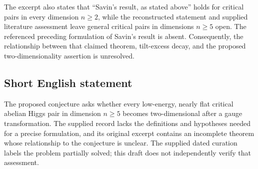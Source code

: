 \documentclass[11pt]{article}
\begin{document}
The excerpt also states that ``Savin's result, as stated above'' holds for critical pairs in every dimension \(n\geq2\), while the reconstructed statement and supplied literature assessment leave general critical pairs in dimensions \(n\geq5\) open. The referenced preceding formulation of Savin's result is absent. Consequently, the relationship between that claimed theorem, tilt-excess decay, and the proposed two-dimensionality assertion is unresolved.
\subsection{Short English statement}
The proposed conjecture asks whether every low-energy, nearly flat critical abelian Higgs pair in dimension \(n\geq5\) becomes two-dimensional after a gauge transformation. The supplied record lacks the definitions and hypotheses needed for a precise formulation, and its original excerpt contains an incomplete theorem whose relationship to the conjecture is unclear. The supplied dated curation labels the problem partially solved; this draft does not independently verify that assessment.
\end{document}
